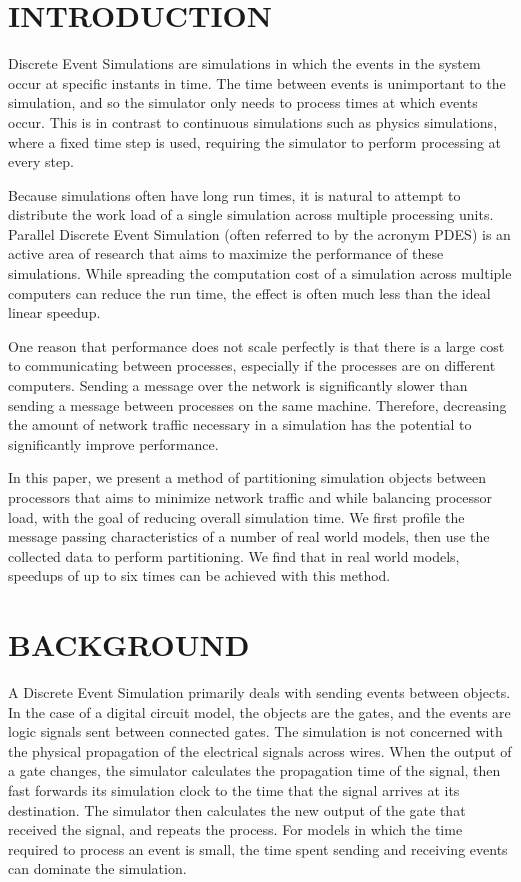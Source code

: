\documentclass{wscpaperproc}
\begin{document}
\section{INTRODUCTION}\label{sec:intro}

Discrete Event Simulations are simulations in which the events in the system occur at specific instants in time. The time between events is unimportant to the simulation, and so the simulator only needs to process times at which events occur. This is in contrast to continuous simulations such as physics simulations, where a fixed time step is used, requiring the simulator to perform processing at every step. 

Because simulations often have long run times, it is natural to attempt to distribute the work load of a single simulation across multiple processing units. Parallel Discrete Event Simulation (often referred to by the acronym PDES) is an active area of research that aims to maximize the performance of these simulations. While spreading the computation cost of a simulation across multiple computers can reduce the run time, the effect is often much less than the ideal linear speedup. 

One reason that performance does not scale perfectly is that there is a large cost to communicating between processes, especially if the processes are on different computers. Sending a message over the network is significantly slower than sending a message between processes on the same machine. Therefore, decreasing the amount of network traffic necessary in a simulation has the potential to significantly improve performance.

In this paper, we present a method of partitioning simulation objects between processors that aims to minimize network traffic and while balancing processor load, with the goal of reducing overall simulation time. We first profile the message passing characteristics of a number of real world models, then use the collected data to perform partitioning. We find that in real world models, speedups of up to six times can be achieved with this method. 

\section{BACKGROUND}\label{sec:background}

A Discrete Event Simulation primarily deals with sending events between objects. In the case of a digital circuit model, the objects are the gates, and the events are logic signals sent between connected gates. The simulation is not concerned with the physical propagation of the electrical signals across wires. When the output of a gate changes, the simulator calculates the propagation time of the signal, then fast forwards its simulation clock to the time that the signal arrives at its destination. The simulator then calculates the new output of the gate that received the signal, and repeats the process. For models in which the time required to process an event is small, the time spent sending and receiving events can dominate the simulation.
\end{document}
